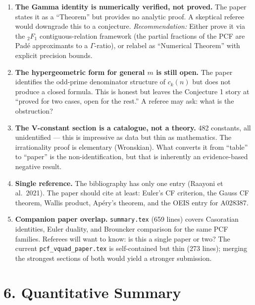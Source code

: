 \documentclass[11pt]{article}
\begin{document}
\begin{enumerate}[leftmargin=1.5em]
\item \textbf{The Gamma identity is numerically verified, not proved.}
  The paper states it as a ``Theorem'' but provides no analytic proof.
  A skeptical referee would downgrade this to a conjecture.
  \emph{Recommendation:} Either prove it via the ${}_2F_1$ contiguous-relation
  framework (the partial fractions of the PCF are Pad\'e approximants to a
  $\Gamma$-ratio), or relabel as ``Numerical Theorem'' with explicit precision
  bounds.

\item \textbf{The hypergeometric form for general $m$ is still open.}
  The paper identifies the odd-prime denominator structure of $c_k(n)$
  but does not produce a closed formula.
  This is honest but leaves the Conjecture 1 story at ``proved for two cases,
  open for the rest.'' A referee may ask: what is the obstruction?

\item \textbf{The V-constant section is a catalogue, not a theory.}
  482 constants, all unidentified --- this is impressive as data but thin
  as mathematics.  The irrationality proof is elementary (Wronskian).
  What converts it from ``table'' to ``paper'' is the non-identification,
  but that is inherently an evidence-based negative result.

\item \textbf{Single reference.}
  The bibliography has only one entry (Raayoni et al.\ 2021).
  The paper should cite at least: Euler's CF criterion, the Gauss CF theorem,
  Wallis product, Ap\'ery's theorem, and the OEIS entry for A028387.

\item \textbf{Companion paper overlap.}
  \texttt{summary.tex} (659 lines) covers Casoratian identities, Euler duality,
  and Brouncker comparison for the same PCF families.
  Referees will want to know: is this a single paper or two?
  The current \texttt{pcf\_vquad\_paper.tex} is self-contained but thin (273 lines);
  merging the strongest sections of both would yield a stronger submission.
\end{enumerate}

\section*{6. Quantitative Summary}
\end{document}
